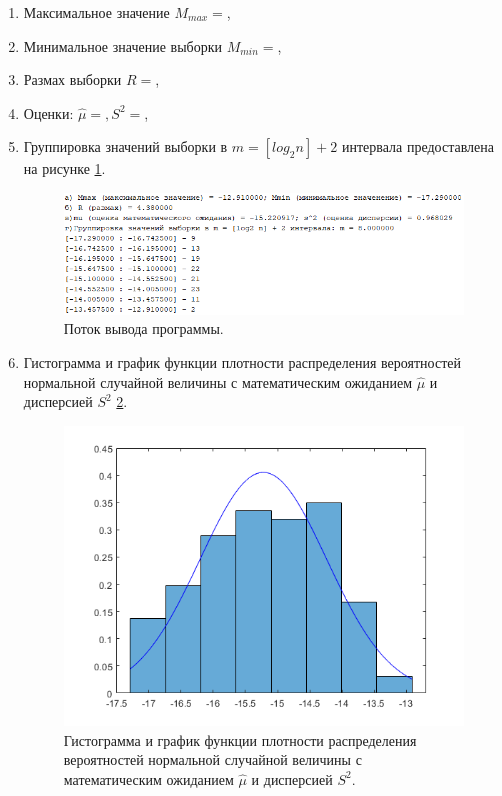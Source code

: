 \documentclass[a4paper,oneside,12pt]{extreport}
\theoremstyle{indented}
\begin{document}
\begin{enumerate}
\item Максимальное значение $M_{max} = $,
\item Минимальное значение выборки $M_{min} = $,
\item Размах выборки $R = $,
\item Оценки: $\hat \mu = , S^2 = $,
\item Группировка значений выборки в $m = [log_2 n] + 2$ интервала предоставлена на рисунке \ref{img:output}.

\begin{figure}[H]
\begin{center}
\includegraphics[scale=0.28]{inc/img/output.png}
\captionsetup{justification=centering}
	\caption{Поток вывода программы.}
	\label{img:output}	
\end{center}
\end{figure}

\item Гистограмма и график функции плотности распределения вероятностей нормальной случайной величины с математическим ожиданием $\hat \mu$ и дисперсией $S^2$ \ref{img:outputGraph}. 

\begin{figure}[H]
\begin{center}
\includegraphics[scale=0.28]{inc/img/outputGraph.png}
\captionsetup{justification=centering}
	\caption{Гистограмма и график функции плотности распределения вероятностей нормальной случайной величины с математическим ожиданием $\hat \mu$ и дисперсией $S^2$.}
	\label{img:outputGraph}	
\end{center}
\end{figure}


\end{enumerate}
\end{document}
